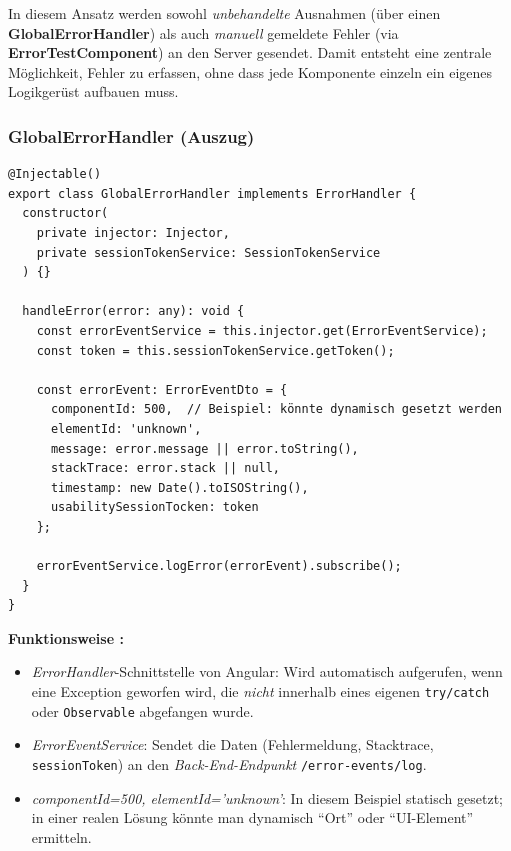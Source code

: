 \documentclass[12pt,oneside]{article}
\begin{document}
In diesem Ansatz werden sowohl \emph{unbehandelte} Ausnahmen (über einen \textbf{GlobalErrorHandler}) als auch \emph{manuell} gemeldete Fehler (via \textbf{ErrorTestComponent}) an den Server gesendet. Damit entsteht eine zentrale Möglichkeit, Fehler zu erfassen, ohne dass jede Komponente einzeln ein eigenes Logikgerüst aufbauen muss.

\subsubsection{GlobalErrorHandler (Auszug)}

\begin{lstlisting}
@Injectable()
export class GlobalErrorHandler implements ErrorHandler {
  constructor(
    private injector: Injector,
    private sessionTokenService: SessionTokenService
  ) {}

  handleError(error: any): void {
    const errorEventService = this.injector.get(ErrorEventService);
    const token = this.sessionTokenService.getToken();

    const errorEvent: ErrorEventDto = {
      componentId: 500,  // Beispiel: könnte dynamisch gesetzt werden
      elementId: 'unknown',
      message: error.message || error.toString(),
      stackTrace: error.stack || null,
      timestamp: new Date().toISOString(),
      usabilitySessionTocken: token
    };

    errorEventService.logError(errorEvent).subscribe();
  }
}
\end{lstlisting}

\noindent
\textbf{Funktionsweise :}
\begin{itemize}
  \item \emph{ErrorHandler}-Schnittstelle von Angular: Wird automatisch aufgerufen, wenn eine Exception geworfen wird, die \emph{nicht} innerhalb eines eigenen \lstinline|try/catch| oder \lstinline|Observable| abgefangen wurde.
  \item \emph{ErrorEventService}: Sendet die Daten (Fehlermeldung, Stacktrace, \texttt{sessionToken}) an den \emph{Back-End-Endpunkt} \lstinline|/error-events/log|.
  \item \emph{componentId=500, elementId='unknown'}: In diesem Beispiel statisch gesetzt; in einer realen Lösung könnte man dynamisch \enquote{Ort} oder \enquote{UI-Element} ermitteln.
\end{itemize}
\end{document}

